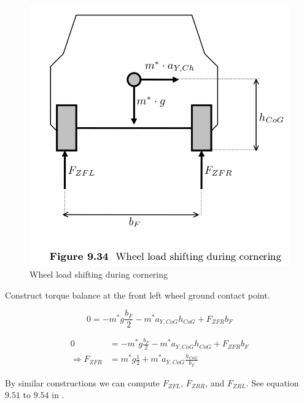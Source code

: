 \begin{figure}
    \centering
    \includegraphics[width=\textwidth]{draft/stolen-figures/wheel-load-shifting-cornering.png}
    \caption{Wheel load shifting during cornering}
    \label{fig:wheel-load-shifting-during-cornering}
\end{figure}

Construct torque balance at the front left wheel ground contact point. 

\begin{equation}
  0 = -m^* g \frac{b_F}{2} - m^* a_{Y,CoG} h_{CoG} + F_{ZFR} b_F
\end{equation}

\begin{align}
  0 &= -m^* g \frac{b_F}{2} - m^* a_{Y,CoG} h_{CoG} + F_{ZFR} b_F \\
  \Rightarrow F_{ZFR} &= m^* g \frac{1}{2} + m^* a_{Y,CoG} \frac{h_{CoG}}{b_F}
\end{align}

By similar constructions we can compute $F_{ZFL}$, $F_{ZRR}$, and $F_{ZRL}$. See equation $9.51$ to $9.54$ in \cite{kiencke}.







